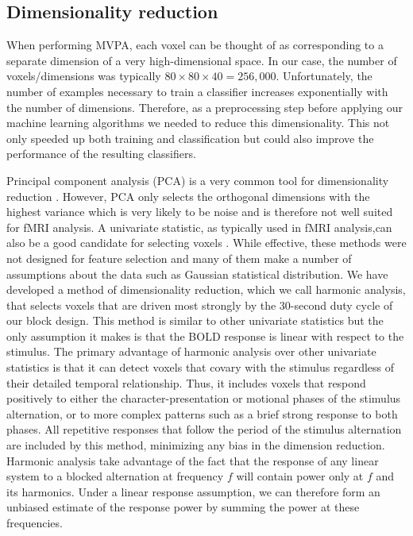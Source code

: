 \documentclass{article}
\begin{document}
\subsection{Dimensionality reduction}
When performing MVPA, each voxel can be thought of as corresponding to a separate dimension of a very high-dimensional space.
In our case, the number of voxels/dimensions was typically $80 \times 80 \times 40 = 256,000$.
Unfortunately, the number of examples necessary to train a classifier increases exponentially with the number of dimensions.
Therefore, as a preprocessing step before applying our machine learning algorithms we needed to reduce this dimensionality.
This not only speeded up both training and classification but could also improve the performance of the resulting classifiers.

Principal component analysis (PCA) is a very common tool for dimensionality reduction \citep{Hotelling1933}.
However, PCA only selects the orthogonal dimensions with the highest variance which is very likely to be noise and is therefore not well suited for fMRI analysis.
A univariate statistic, as typically used in  fMRI analysis,can also be a good candidate for selecting voxels \citep{Norman2006,Pereira2009}.
While effective, these methods were not designed for feature selection and many of them make a number of assumptions about the data such as Gaussian statistical distribution.
We have developed a method of dimensionality reduction, which we call harmonic analysis, that selects voxels that are driven most strongly by the 30-second duty cycle of our block design.
This method is similar to other univariate statistics but the only assumption it makes is that the BOLD response is linear with respect to the stimulus.
The primary advantage  of harmonic analysis over other univariate statistics is that it can detect voxels that covary with the stimulus regardless of their detailed temporal relationship. Thus, it includes voxels that respond positively to either the character-presentation or motional phases of the stimulus alternation, or to more complex patterns such as a brief strong response to both phases. All repetitive responses that follow the period of the stimulus alternation are included by this method, minimizing any bias in the dimension reduction.
Harmonic analysis take advantage of the fact that the response of any linear system to a blocked alternation at frequency $f$ will contain power only at $f$ and its harmonics. 
Under a linear response assumption, we can therefore form an unbiased estimate of the response power by summing the power at these frequencies. 
\end{document}
